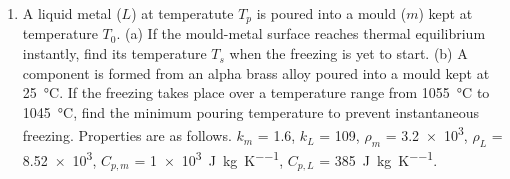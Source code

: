 \begin{enumerate}
\item A liquid metal ($L$) at temperatute $T_p$ is poured into a mould ($m$)
kept at temperature $T_0$. (a) If the mould-metal surface reaches thermal
equilibrium instantly, find its temperature $T_s$ when the freezing is yet to
start. (b) A component is formed from an alpha brass alloy poured into a mould
kept at \SI{25}{\celsius}. If the freezing takes place over a temperature range
from \SI{1055}{\celsius} to \SI{1045}{\celsius}, find the minimum pouring
temperature to prevent instantaneous freezing. Properties are as follows. $k_m$
= \SI{1.6}{\wpmk}, $k_L$ = \SI{109}{\wpmk}, $\rho_m$ = \SI{3.2e3}{\kgpmc},
$\rho_L$ = \SI{8.52e3}{\kgpmc}, $C_{p,m}$ =
\SI{1e3}{\joule\per\kilo\gram\per\kelvin}, $C_{p,L}$ =
\SI{385}{\joule\per\kilo\gram\per\kelvin}.

\end{enumerate}

